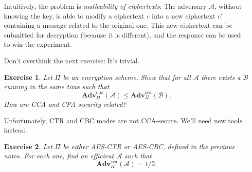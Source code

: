 \documentclass[11pt]{article}
\newtheorem{exercise}{Exercise}
\newcommand{\calA}{\mathcal{A}}
\newcommand{\calB}{\mathcal{B}}
\newcommand{\Adv}{\mathbf{Adv}}
\newcommand{\AdvCPA}[2]{\Adv^{\mathrm{cpa}}_{#1}({#2})}
\newcommand{\AdvCCA}[2]{\Adv^{\mathrm{cca}}_{#1}({#2})}
\begin{document}
Intuitively, the problem is \emph{malleability of ciphertexts}: The adversary
$\calA$, without knowing the key, is able to modify a ciphertext $c$ into a new
ciphertext $c'$ containing a message related to the original one. This new
ciphertext can be submitted for decryption (because it is different), and
the response can be used to win the experiment.

Don't overthink the next exercise: It's trivial.
\begin{exercise}
    Let $\Pi$ be an encryption scheme. Show that for all $\calA$ there exists
    a $\calB$ running in the same time such that
    \[
        \AdvCPA{\Pi}{\calA} \leq \AdvCCA{\Pi}{\calB}.
    \]
    How are CCA and CPA security related?
\end{exercise}

Unfortunately, CTR and CBC modes are not CCA-secure. We'll need new tools
instead.
\begin{exercise}
    Let $\Pi$ be either AES-CTR or AES-CBC, defined in the previous notes.
    For each one, find an efficient
    $\calA$ such that
    \[
        \AdvCCA{\Pi}{\calA} = 1/2.
    \]
\end{exercise}
\end{document}
